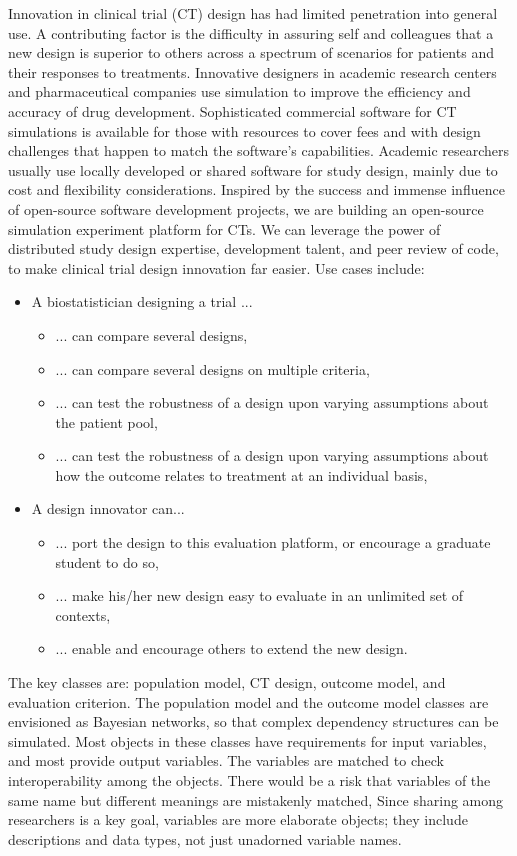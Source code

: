 \documentclass[12pt]{amsart}
\begin{document}
Innovation in clinical trial (CT) design has had limited  penetration into general use.  A contributing factor is the difficulty in assuring self and colleagues that a new design is superior to others across a spectrum of scenarios for patients and their responses to treatments. Innovative designers in academic research centers and pharmaceutical companies use simulation  to improve the efficiency and accuracy of drug development. Sophisticated commercial software for CT simulations is available for those with resources to cover fees and with design challenges that happen to match the software's capabilities. Academic researchers  usually use locally developed or shared software for study design, mainly due to cost and flexibility considerations. 
Inspired by the success and immense influence of open-source software development projects, we are building an open-source simulation experiment platform for CTs. 
We can leverage the power of distributed study design expertise, development talent, and peer review of code,
to make  clinical trial design innovation far easier. Use cases include:
\begin{itemize}
\item A biostatistician designing a trial ...
\begin{itemize}
\item ... can compare several designs,
\item ... can compare several designs on multiple criteria,
\item ... can test the robustness of a design upon varying assumptions about the patient pool,
\item ... can test the robustness of a design upon varying assumptions about how the outcome relates to treatment at an individual basis,

\end{itemize}
\item A design innovator can...	
\begin{itemize}
\item ... port the design to this evaluation platform, or encourage a graduate student to do so,
\item ... make his/her new design easy to evaluate in an unlimited set of contexts,
\item ... enable and encourage others to extend the new design.
\end{itemize}
\end{itemize}


The key classes are: population model, CT design, outcome model, and evaluation criterion. 
The population model and the outcome model classes are envisioned as Bayesian networks, so that complex dependency structures can be simulated.
Most objects in these classes have requirements for input variables,
and most provide output variables.
The variables are matched to check interoperability among the objects. 
There would be a risk that variables of the same name but different meanings are mistakenly matched,
Since sharing among researchers is a key goal,
variables are more elaborate objects;
they include descriptions and data types, not just unadorned variable names.
\end{document}
